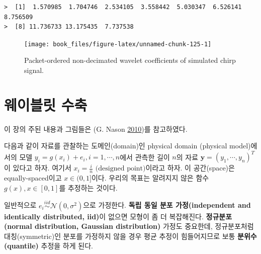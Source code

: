 \documentclass[b5paper,]{book}
\makeatletter
\newenvironment{Shaded}{\begin{snugshade}}{\end{snugshade}}
\newcommand{\KeywordTok}[1]{\textcolor[rgb]{0.13,0.29,0.53}{\textbf{{#1}}}}
\newcommand{\DataTypeTok}[1]{\textcolor[rgb]{0.13,0.29,0.53}{{#1}}}
\newcommand{\DecValTok}[1]{\textcolor[rgb]{0.00,0.00,0.81}{{#1}}}
\newcommand{\StringTok}[1]{\textcolor[rgb]{0.31,0.60,0.02}{{#1}}}
\newcommand{\NormalTok}[1]{{#1}}
\newenvironment{kframe}{%
\medskip{}
\setlength{\fboxsep}{.8em}
 \def\at@end@of@kframe{}%
 \ifinner\ifhmode%
  \def\at@end@of@kframe{\end{minipage}}%
  \begin{minipage}{\columnwidth}%
 \fi\fi%
 \def\FrameCommand##1{\hskip\@totalleftmargin \hskip-\fboxsep
 \colorbox{shadecolor}{##1}\hskip-\fboxsep
     \hskip-\linewidth \hskip-\@totalleftmargin \hskip\columnwidth}%
 \MakeFramed {\advance\hsize-\width
   \@totalleftmargin\z@ \linewidth\hsize
   \@setminipage}}%
 {\par\unskip\endMakeFramed%
 \at@end@of@kframe}
\renewenvironment{Shaded}{\begin{kframe}}{\end{kframe}}
\theoremstyle{definition}
\theoremstyle{definition}
\theoremstyle{definition}
\theoremstyle{remark}
\makeatother
\begin{document}
\begin{verbatim}
>  [1]  1.570985  1.704746  2.534105  3.558442  5.030347  6.526141  8.756509
>  [8] 11.736733 13.175435  7.737538
\end{verbatim}

\begin{Shaded}
\end{Shaded}

\begin{figure}

{\centering \texttt{[image: book\_files/figure-latex/unnamed-chunk-125-1]} 

}

\caption{Packet-ordered non-decimated wavelet coefficients of simulated chirp signal.}\label{fig:unnamed-chunk-125}
\end{figure}

\chapter{웨이블릿 수축}\label{waveletshrinkage}

이 장의 주된 내용과 그림들은 (G. Nason
\protect\hyperlink{ref-Nason2010}{2010})를 참고하였다.

다음과 같이 자료를 관찰하는 도메인(domain)인 physical domain (physical
model)에서의 모델 \(y_{i}=g(x_{i})+e_{i}, i=1,\cdots,n\)에서 관측한 길이
\(n\)의 자료 \(\mathbf{y}=(y_{1},\cdots,y_{n})^{T}\)이 있다고 하자.
여기서 \(x_{i}=\frac{i}{n} \text{ (designed point)}\)이라고 하자. 이
공간(space)은 equally-spaced이고 \(x \in (0, 1]\)이다. 우리의 목표는
알려지지 않은 함수 \(g(x), x \in [0,1]\)를 추정하는 것이다.

일반적으로 \(e_{i} \stackrel{iid}{\sim} \mathcal{N}(0,\sigma^{2})\)으로
가정한다. \textbf{독립 동일 분포 가정(independent and identically
distributed, iid)}이 없으면 모형이 좀 더 복잡해진다.
\textbf{정규분포(normal distribution, Gaussian distribution)} 가정도
중요한데, 정규분포처럼 대칭(symmetric)인 분포를 가정하지 않을 경우 평균
추정이 힘들어지므로 보통 \textbf{분위수(quantile)} 추정을 하게 된다.
\end{document}
